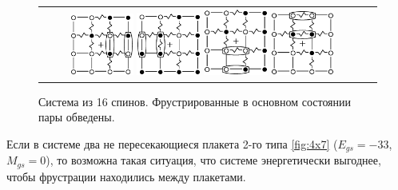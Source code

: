 \documentclass[utf8, babel, sor, jor, amsmath, amssymb, reprint]{elsarticle} %
\begin{document}
\begin{figure}[htbp]
	\centering
	\begin{tabular}{cc}
		\includegraphics[width=0.2\textwidth]{pictures/Cl1_Type2_gs1.eps}  \hspace{0.03\textwidth}
		\includegraphics[width=0.2\textwidth]{pictures/Cl1_Type2_gs2.eps} 
		\hspace{0.03\textwidth}
		\includegraphics[width=0.2\textwidth]{pictures/Cl1_Type2_gs3.eps}  \hspace{0.03\textwidth}
		\includegraphics[width=0.2\textwidth]{pictures/Cl1_Type2_gs4.eps} \\ 
	\end{tabular}
	\caption{Система из 16 спинов. Фрустрированные в основном состоянии пары обведены.}
	\label{fig:4x4.1}
\end{figure}

Если в системе два не пересекающиеся плакета 2-го типа \ref{fig:4x7} ($E_{gs}=-33$, $M_{gs}=0$), то возможна такая ситуация, что системе энергетически выгоднее, чтобы фрустрации находились между плакетами. 
\end{document}
